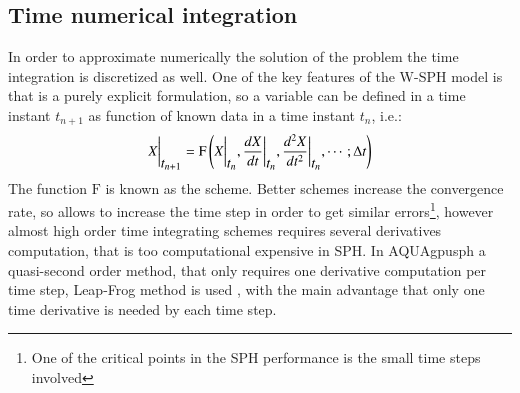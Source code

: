 \subsection{Time numerical integration}
\label{ss:sph:discrete:timestep}
%
In order to approximate numerically the solution of the problem the time integration is discretized
as well.\rc
%
One of the key features of the W-SPH model is that is a purely explicit formulation, so a variable
can be defined in a time instant $t_{n+1}$ as function of known data in a time instant $t_n$, i.e.:
%
\begin{eqnarray}
X \bigg\vert_{\displaystyle{t_{n+1}}} = \mathrm{F}\left(
	X \bigg\vert_{\displaystyle{t_{n}}},
	\frac{d X}{dt} \bigg\vert_{\displaystyle{t_{n}}},
	\frac{d^2 X}{dt^2} \bigg\vert_{\displaystyle{t_{n}}},
	\cdots; \Delta t
	\right)
\end{eqnarray}
%
The function $\mathrm{F}$ is known as the scheme. Better schemes increase the convergence rate, so
allows to increase the time step in order to get similar errors\footnote{One of the critical points
in the SPH performance is the small time steps involved}, however almost high order time integrating
schemes requires several derivatives computation, that is too computational expensive in SPH. In
AQUAgpusph a quasi-second order method, that only requires one derivative computation per time step,
Leap-Frog method is used \citep{souto2006}, with the main advantage that only one time derivative
is needed by each time step.
%
%
